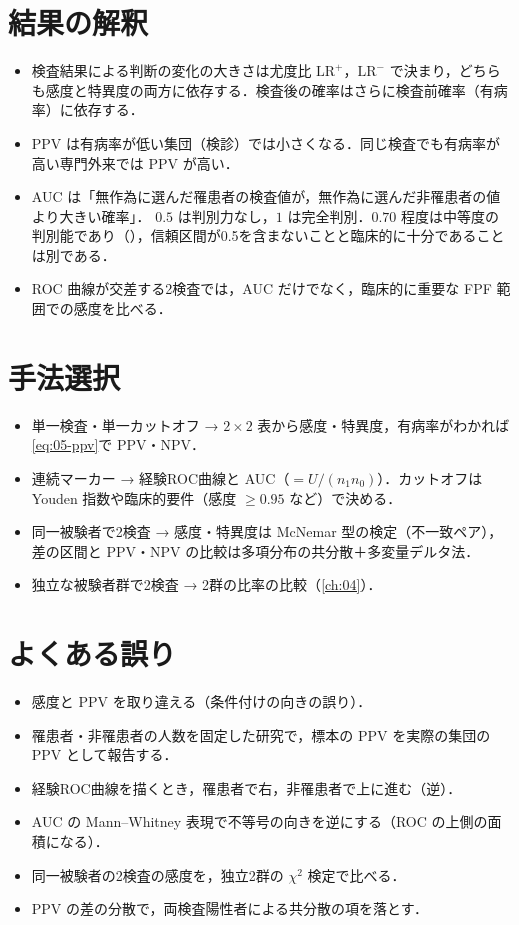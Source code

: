 \section{結果の解釈}\label{sec:05-interp}
\begin{itemize}
\item 検査結果による判断の変化の大きさは尤度比 $\mathrm{LR}^+$，$\mathrm{LR}^-$ で決まり，どちらも感度と特異度の両方に依存する．検査後の確率はさらに検査前確率（有病率）に依存する．
\item PPV は有病率が低い集団（検診）では小さくなる．同じ検査でも有病率が高い専門外来では PPV が高い．
\item AUC は「無作為に選んだ罹患者の検査値が，無作為に選んだ非罹患者の値より大きい確率」．
      $0.5$ は判別力なし，$1$ は完全判別．$0.70$ 程度は中等度の判別能であり（），信頼区間が0.5を含まないことと臨床的に十分であることは別である．
\item ROC 曲線が交差する2検査では，AUC だけでなく，臨床的に重要な FPF 範囲での感度を比べる．
\end{itemize}

\section{手法選択}\label{sec:05-choice}
\begin{itemize}
\item 単一検査・単一カットオフ → $2\times2$ 表から感度・特異度，有病率がわかれば\cref{eq:05-ppv}で PPV・NPV．
\item 連続マーカー → 経験ROC曲線と AUC（$=U/(n_1n_0)$）．カットオフは Youden 指数や臨床的要件（感度 $\ge0.95$ など）で決める．
\item 同一被験者で2検査 → 感度・特異度は McNemar 型の検定（不一致ペア），差の区間と PPV・NPV の比較は多項分布の共分散＋多変量デルタ法．
\item 独立な被験者群で2検査 → 2群の比率の比較（\cref{ch:04}）．
\end{itemize}

\section{よくある誤り}\label{sec:05-err}
\begin{warnbox}
\begin{itemize}
\item 感度と PPV を取り違える（条件付けの向きの誤り）．
\item 罹患者・非罹患者の人数を固定した研究で，標本の PPV を実際の集団の PPV として報告する．
\item 経験ROC曲線を描くとき，罹患者で右，非罹患者で上に進む（逆）．
\item AUC の Mann--Whitney 表現で不等号の向きを逆にする（ROC の上側の面積になる）．
\item 同一被験者の2検査の感度を，独立2群の $\chi^2$ 検定で比べる．
\item PPV の差の分散で，両検査陽性者による共分散の項を落とす．
\end{itemize}
\end{warnbox}

